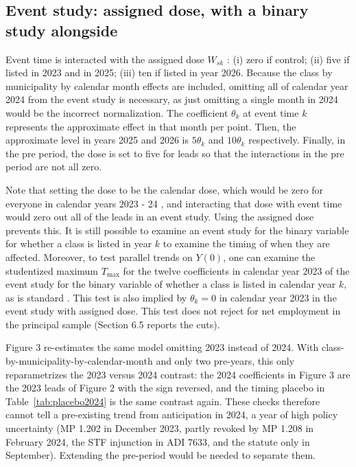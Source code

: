\documentclass[12pt,a4paper]{article}
\begin{document}
\subsection{Event study: assigned dose, with a binary study alongside}

Event time is interacted with the assigned dose $W_{sk}$ : (i) zero if control; (ii) five if listed in 2023 and in 2025; (iii) ten if listed in year 2026. Because the class by municipality by calendar month effects are included, omitting all of calendar year 2024 from the event study is necessary, as just omitting a single month in 2024 would be the incorrect normalization. The coefficient $\theta_k$ at event time $k$ represents the approximate effect in that month per point. Then, the approximate level in years 2025 and 2026 is $5 \theta_{k}$ and $10 \theta_{k}$ respectively. Finally, in the pre period, the dose is set to five for leads so that the interactions in the pre period are not all zero.

Note that setting the dose to be the calendar dose, which would be zero for everyone in calendar years 2023 - 24 , and interacting that dose with event time would zero out all of the leads in an event study. Using the assigned dose prevents this. It is still possible to examine an event study for the binary variable for whether a class is listed in year $k$ to examine the timing of when they are affected. Moreover, to test parallel trends on $Y(0)$, one can examine the studentized maximum $T_{\max }$ for the twelve coefficients in calendar year 2023 of the event study for the binary variable of whether a class is listed in calendar year $k$, as is standard \citep{montiel2019,roth2023}. This test is also implied by $\theta_{k}=0$ in calendar year 2023 in the event study with assigned dose. This test does not reject for net employment in the principal sample (Section 6.5 reports the cuts).

Figure 3 re-estimates the same model omitting 2023 instead of 2024. With class-by-municipality-by-calendar-month and only two pre-years, this only reparametrizes the 2023 versus 2024 contrast: the 2024 coefficients in Figure 3 are the 2023 leads of Figure 2 with the sign reversed, and the timing placebo in Table~\ref{tab:placebo2024} is the same contrast again. These checks therefore cannot tell a pre-existing trend from anticipation in 2024, a year of high policy uncertainty (MP 1.202 in December 2023, partly revoked by MP 1.208 in February 2024, the STF injunction in ADI 7633, and the statute only in September). Extending the pre-period would be needed to separate them.
\end{document}
